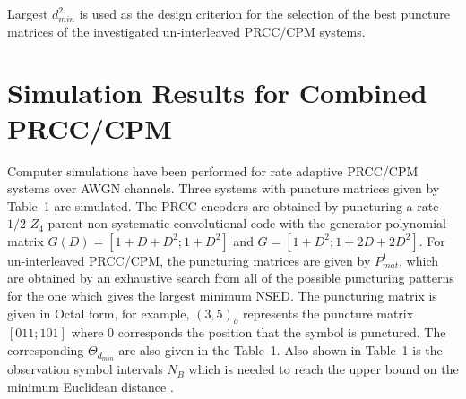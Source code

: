 \documentclass[12pt,twoside,onecolumn,a4paper,english]{IEEEtran2e}
\begin{document}
Largest $d_{min}^2$ is used as the design criterion for the
selection of the best puncture matrices of the investigated
un-interleaved PRCC/CPM systems.


\section{Simulation Results for Combined
PRCC/CPM}\label{sec:jscnumericalresults} Computer simulations
have been performed for rate adaptive
PRCC/CPM systems over AWGN channels. Three systems with puncture
matrices given by Table~1 are simulated. The PRCC encoders are
obtained by puncturing a rate $1/2$ $Z_4$ parent non-systematic
convolutional code with the generator polynomial matrix
$G(D)=[1+D+D^2;1+D^2]$ and $G=[1+ D^2; 1+2D+2D^2]$. For un-interleaved PRCC/CPM, the puncturing matrices are given by $P_{mat}^1$, which are obtained by an
exhaustive search from all of the possible puncturing patterns for
the one which gives the largest minimum NSED. The puncturing matrix is given in Octal form, for example, $(3,5)_o$ represents the puncture matrix $[0 1 1;1 0 1]$ where $0$ corresponds the position that the symbol is punctured.
The corresponding $\Theta_{d_{min}}$ are also given in the Table~1.
Also shown in Table~1 is the observation symbol intervals $N_B$ which is
needed to reach the upper bound on the minimum Euclidean distance \cite{anderson}.
\end{document}
